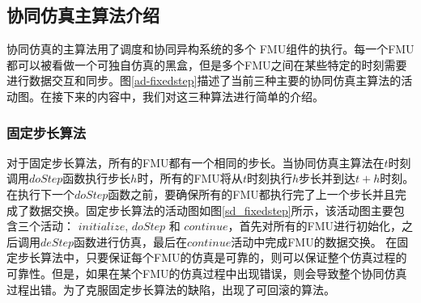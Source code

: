 \subsection{协同仿真主算法介绍}
协同仿真的主算法用了调度和协同异构系统的多个	FMU组件的执行。每一个FMU都可以被看做一个可独自仿真的黑盒，但是多个FMU之间在某些特定的时刻需要进行数据交互和同步。图\ref{ad-fixedstep}描述了当前三种主要的协同仿真主算法的活动图。在接下来的内容中，我们对这三种算法进行简单的介绍。
\begin{figure}[htbp]
\end{figure}
\subsubsection{固定步长算法}
对于固定步长算法\cite{BromanBGLMTW13}，所有的FMU都有一个相同的步长。当协同仿真主算法在$t$时刻调用$doStep$函数执行步长$h$时，所有的FMU将从$t$时刻执行$h$步长并到达$t+h$时刻。在执行下一个$doStep$函数之前，要确保所有的FMU都执行完了上一个步长并且完成了数据交换。固定步长算法的活动图如图\ref{sd_fixedstep}所示，该活动图主要包含三个活动： $initialize$, $doStep$ 和 $continue$，首先对所有的FMU进行初始化，之后调用$deStep$函数进行仿真，最后在$continue$活动中完成FMU的数据交换。 在固定步长算法中，只要保证每个FMU的仿真是可靠的，则可以保证整个仿真过程的可靠性。但是，如果在某个FMU的仿真过程中出现错误，则会导致整个协同仿真过程出错。为了克服固定步长算法的缺陷，出现了可回滚的算法。
